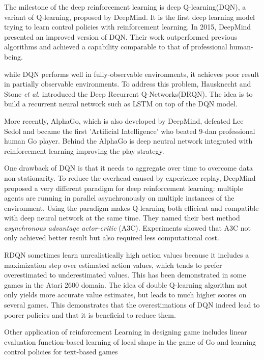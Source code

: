 
The milestone of the deep reinforcement learning is deep Q-learning(DQN)\cite{mnih2013playing}, a variant of Q-learning, proposed by DeepMind. It is the first deep learning model trying to learn control policies with reinforcement learning. In 2015, DeepMind presented an improved version of DQN\cite{mnih2015human}. Their work outperformed previous algorithms and achieved a capability comparable to that of professional human-being.
%

while DQN performs well in fully-observable environments, it achieves poor result in partially observable environments. To address this problem, Hausknecht and Stone\textit{ et al.} \cite{hausknecht2015deep} introduced the Deep Recurrent Q-Networks(DRQN). The idea is to build a recurrent neural network such as LSTM on top of the DQN model.
%

More recently, AlphaGo\cite{brockman2016openai}, which is also developed by DeepMind, defeated Lee Sedol and became the first 'Artificial Intelligence' who beated 9-dan professional human Go player. Behind the AlphaGo is deep neutral network integrated with reinforcement learning improving the play strategy.
%

One drawback of DQN is that it needs to aggregate over time to overcome data non-stationarity. To reduce the overhead caused by experience replay, DeepMind \cite{mnih2016asynchronous} proposed a very different paradigm for deep reinforcement learning: multiple agents are running in parallel asynchronously on multiple instances of the environment. Using the paradigm makes Q-learning both efficient and compatible with deep neural network at the same time. They named their best method \textit{asynchronous advantage actor-critic} (A3C). Experiments showed that A3C not only achieved better result but also required less computational cost.
%

RDQN sometimes learn unrealistically high action values because it includes a maximization step over estimated action values, which tends to
prefer overestimated to underestimated values. This has been demonstrated in some games in the Atari 2600 domain. The idea of double Q-learning algorithm \cite{van2015deep} not only yields more accurate value estimates, but leads to much higher scores on several games. This demonstrates that the overestimations of DQN indeed lead to poorer policies and that it is beneficial to reduce them.

Other application of reinforcement Learning in designing game includes linear evaluation function-based learning of local shape in the game of Go \cite{silver2007reinforcement} and learning control policies for text-based games \cite{narasimhan2015language}